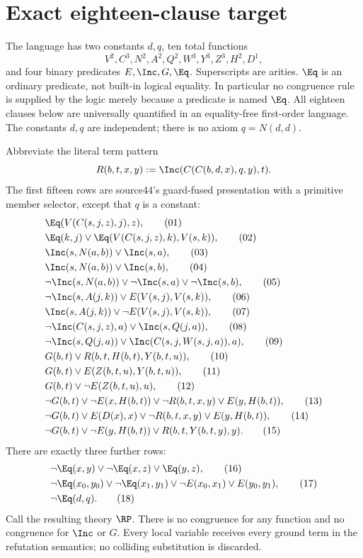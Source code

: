 \section{Exact eighteen-clause target}

The language has two constants $d,q$, ten total functions
\[
 V^2,C^3,N^2,A^2,Q^2,W^3,Y^3,Z^3,H^2,D^1,
\]
and four binary predicates $E,\Inc,G,\Eq$. Superscripts are arities.
$\Eq$ is an ordinary predicate, not built-in logical equality. In
particular no congruence rule is supplied by the logic merely because a
predicate is named $\Eq$. All eighteen clauses below are universally
quantified in an equality-free first-order language. The constants $d,q$
are independent; there is no axiom $q=N(d,d)$.

Abbreviate the literal term pattern
\[
 R(b,t,x,y):=\Inc(C(C(b,d,x),q,y),t).
\]
The first fifteen rows are source44's guard-fused presentation with a
primitive member selector, except that $q$ is a constant:
\begin{align}
&\Eq(V(C(s,j,z),j),z),\tag{01}\label{rp01}\\
&\Eq(k,j)\lor\Eq(V(C(s,j,z),k),V(s,k)),\tag{02}\label{rp02}\\
&\Inc(s,N(a,b))\lor\Inc(s,a),\tag{03}\label{rp03}\\
&\Inc(s,N(a,b))\lor\Inc(s,b),\tag{04}\label{rp04}\\
&\neg\Inc(s,N(a,b))\lor\neg\Inc(s,a)\lor\neg\Inc(s,b),\tag{05}\label{rp05}\\
&\neg\Inc(s,A(j,k))\lor E(V(s,j),V(s,k)),\tag{06}\label{rp06}\\
&\Inc(s,A(j,k))\lor\neg E(V(s,j),V(s,k)),\tag{07}\label{rp07}\\
&\neg\Inc(C(s,j,z),a)\lor\Inc(s,Q(j,a)),\tag{08}\label{rp08}\\
&\neg\Inc(s,Q(j,a))\lor\Inc(C(s,j,W(s,j,a)),a),\tag{09}\label{rp09}\\
&G(b,t)\lor R(b,t,H(b,t),Y(b,t,u)),\tag{10}\label{rp10}\\
&G(b,t)\lor E(Z(b,t,u),Y(b,t,u)),\tag{11}\label{rp11}\\
&G(b,t)\lor\neg E(Z(b,t,u),u),\tag{12}\label{rp12}\\
&\neg G(b,t)\lor\neg E(x,H(b,t))\lor\neg R(b,t,x,y)
                  \lor E(y,H(b,t)),\tag{13}\label{rp13}\\
&\neg G(b,t)\lor E(D(x),x)\lor\neg R(b,t,x,y)
                  \lor E(y,H(b,t)),\tag{14}\label{rp14}\\
&\neg G(b,t)\lor\neg E(y,H(b,t))\lor R(b,t,Y(b,t,y),y).\tag{15}\label{rp15}
\end{align}
There are exactly three further rows:
\begin{align}
&\neg\Eq(x,y)\lor\neg\Eq(x,z)\lor\Eq(y,z),\tag{16}\label{rp16}\\
&\neg\Eq(x_0,y_0)\lor\neg\Eq(x_1,y_1)
            \lor\neg E(x_0,x_1)\lor E(y_0,y_1),\tag{17}\label{rp17}\\
&\neg\Eq(d,q).\tag{18}\label{rp18}
\end{align}
Call the resulting theory $\RP$. There is no congruence for any function and no
congruence for $\Inc$ or $G$. Every local variable receives every ground
term in the refutation semantics; no colliding substitution is discarded.

